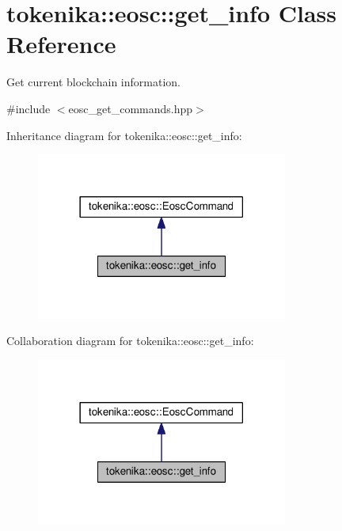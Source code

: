 \hypertarget{classtokenika_1_1eosc_1_1get__info}{}\section{tokenika\+:\+:eosc\+:\+:get\+\_\+info Class Reference}
\label{classtokenika_1_1eosc_1_1get__info}


Get current blockchain information.  




{\ttfamily \#include $<$eosc\+\_\+get\+\_\+commands.\+hpp$>$}



Inheritance diagram for tokenika\+:\+:eosc\+:\+:get\+\_\+info\+:\nopagebreak
\begin{figure}[H]
\begin{center}
\leavevmode
\includegraphics[width=234pt]{classtokenika_1_1eosc_1_1get__info__inherit__graph}
\end{center}
\end{figure}


Collaboration diagram for tokenika\+:\+:eosc\+:\+:get\+\_\+info\+:\nopagebreak
\begin{figure}[H]
\begin{center}
\leavevmode
\includegraphics[width=234pt]{classtokenika_1_1eosc_1_1get__info__coll__graph}
\end{center}
\end{figure}
